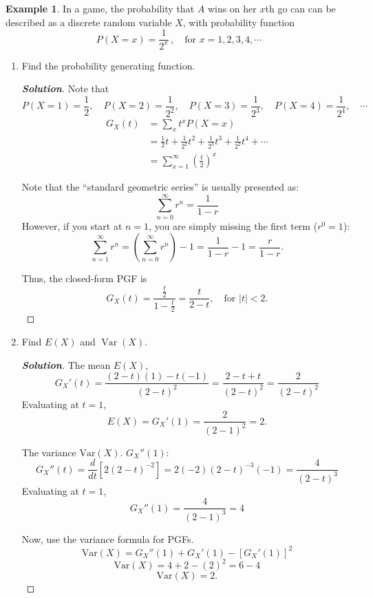 \documentclass[12pt,a4paper]{report}
\theoremstyle{definition}
\newtheorem{example}[thm]{Example}
\theoremstyle{plain}
\theoremstyle{definition}
\begin{document}
\begin{example}
In a game, the probability that $A$ wins on her $x$th go can can be described as a discrete random variable $X$, with probability function \[P(X = x) = \frac{1}{2^x}\,,\quad \text{for}\,\, x = 1,2, 3, 4, \cdots\]
\begin{enumerate}
\item Find the probability generating function.
\begin{proof}[\textbf{\textit{Solution}}]
Note that \[P(X = 1)  = \frac{1}{2}, \quad P(X = 2) = \frac{1}{2^2}, \quad P(X = 3) = \frac{1}{2^3}, \quad P(X = 4) = \frac{1}{2^4}, \quad \cdots\]
\begin{align*}
G_X(t) & = \sum_x t^x P(X = x)\\
& = \frac{1}{2}t + \frac{1}{2^2}t^2 + \frac{1}{2^3}t^3 + \frac{1}{2^2}t^4+ \cdots\\
& = \sum^{\infty}_{x = 1}\left(\frac{t}{2}\right)^x
\end{align*}


Note that the ``standard geometric series'' is usually presented as:\[\sum_{n=0}^{\infty} r^n = \frac{1}{1-r}\]However, if you start at $n=1$, you are simply missing the first term ($r^0 = 1$):\[\sum_{n=1}^{\infty} r^n = \left(\sum_{n=0}^{\infty} r^n\right) - 1 = \frac{1}{1-r} - 1 = \frac{r}{1-r}.\]

Thus, the closed-form PGF is \[G_X(t) = \frac{\frac{t}{2}}{1 - \frac{t}{2}} = \frac{t}{2-t}, \quad \text{for } |t| < 2.\]
\end{proof}


\item Find $E(X)$ and $\operatorname{Var}(X)$.

\begin{proof}[\textbf{\textit{Solution}}]
The mean $E(X)$, \[G_X'(t) = \frac{(2-t)(1) - t(-1)}{(2-t)^2} = \frac{2-t+t}{(2-t)^2} = \frac{2}{(2-t)^2}\]Evaluating at $t=1$, \[E(X) = G_X'(1) = \frac{2}{(2-1)^2} = 2.\]

The variance $\text{Var}(X)$.  $G_X''(1)$:\[G_X''(t) = \frac{d}{dt} [2(2-t)^{-2}] = 2(-2)(2-t)^{-3}(-1) = \frac{4}{(2-t)^3}\] Evaluating at $t=1$, \[G_X''(1) = \frac{4}{(2-1)^3} = 4\]

Now, use the variance formula for PGFs. \[\text{Var}(X) = G_X''(1) + G_X'(1) - [G_X'(1)]^2\]\[\text{Var}(X) = 4 + 2 - (2)^2 = 6 - 4\] \[\text{Var}(X) = 2.\]
\end{proof}
\end{enumerate}
\end{example}
\end{document}
